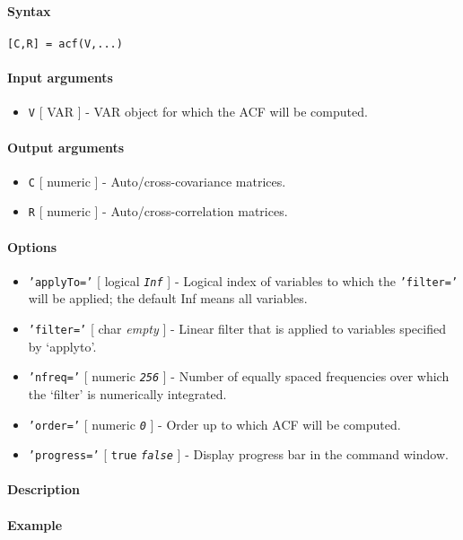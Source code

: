 


	\paragraph{Syntax}\label{syntax}

\begin{verbatim}
[C,R] = acf(V,...)
\end{verbatim}

\paragraph{Input arguments}\label{input-arguments}

\begin{itemize}
\itemsep1pt\parskip0pt
\item
  \texttt{V} {[} VAR {]} - VAR object for which the ACF will be
  computed.
\end{itemize}

\paragraph{Output arguments}\label{output-arguments}

\begin{itemize}
\item
  \texttt{C} {[} numeric {]} - Auto/cross-covariance matrices.
\item
  \texttt{R} {[} numeric {]} - Auto/cross-correlation matrices.
\end{itemize}

\paragraph{Options}\label{options}

\begin{itemize}
\item
  \texttt{'applyTo='} {[} logical \textbar{} \emph{\texttt{Inf}} {]} -
  Logical index of variables to which the \texttt{'filter='} will be
  applied; the default Inf means all variables.
\item
  \texttt{'filter='} {[} char \textbar{} \emph{empty} {]} - Linear
  filter that is applied to variables specified by `applyto'.
\item
  \texttt{'nfreq='} {[} numeric \textbar{} \emph{\texttt{256}} {]} -
  Number of equally spaced frequencies over which the `filter' is
  numerically integrated.
\item
  \texttt{'order='} {[} numeric \textbar{} \emph{\texttt{0}} {]} - Order
  up to which ACF will be computed.
\item
  \texttt{'progress='} {[} \texttt{true} \textbar{}
  \emph{\texttt{false}} {]} - Display progress bar in the command
  window.
\end{itemize}

\paragraph{Description}\label{description}

\paragraph{Example}\label{example}


